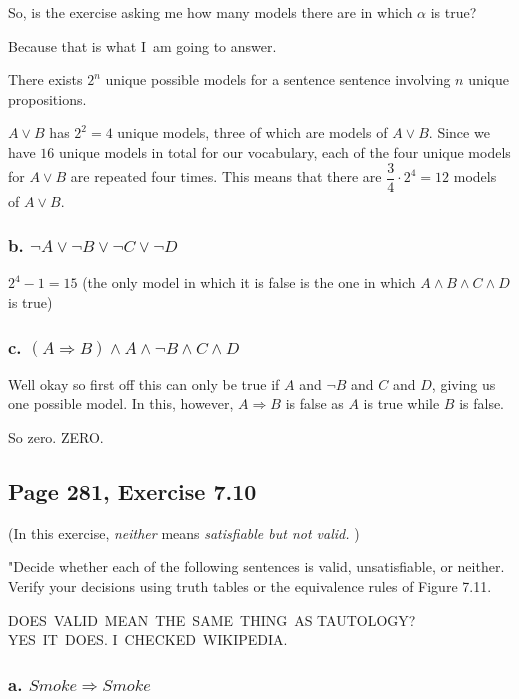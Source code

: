 \documentclass{article}
\begin{document}
So, is the exercise asking me how many models there are in which $\alpha $
is true?

Because that is what I\ am going to answer.

There exists $2^{n}$ unique possible models for a sentence sentence
involving $n$ unique propositions. 

$A\vee B$ has $2^{2}=\allowbreak 4$ unique models, three of which are models
of $A\vee B$. Since we have $16$ unique models in total for our vocabulary,
each of the four unique models for $A\vee B$ are repeated four times. This
means that there are $\dfrac{3}{4}\cdot 2^{4}=\allowbreak 12$ models of $%
A\vee B$.

\subsubsection{b. $\lnot A\vee \lnot B\vee \lnot C\vee \lnot D$}

$2^{4}-1=\allowbreak 15$ (the only model in which it is false is the one in
which $A\wedge B\wedge C\wedge D$ is true)

\subsubsection{c. $\left( A\Rightarrow B\right) \wedge A\wedge \lnot B\wedge
C\wedge D$}

Well okay so first off this can only be true if $A$ and $\lnot B$ and $C$
and $D$, giving us one possible model. In this, however, $A\Rightarrow B$ is
false as $A$ is true while $B$ is false.

So zero. ZERO.

\subsection{Page 281, Exercise 7.10}

(In this exercise, \textit{neither} means \textit{satisfiable but not valid.}%
)

"Decide whether each of the following sentences is valid, unsatisfiable, or
neither. Verify your decisions using truth tables or the equivalence rules
of Figure 7.11.

DOES\ VALID\ MEAN\ THE\ SAME\ THING\ AS TAUTOLOGY? YES\ IT\ DOES. I\
CHECKED\ WIKIPEDIA.

\subsubsection{a. $Smoke\Rightarrow Smoke$}
\end{document}
